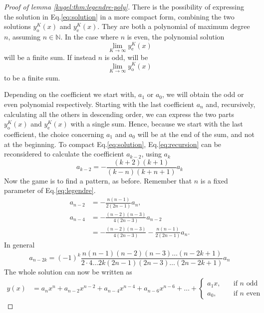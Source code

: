 \begin{proof}[Proof of lemma \ref{kugel:thm:legendre-poly}]
  There is the possibility of expressing the solution in Eq.\eqref{eq:solution} in a more compact form, combining the two solutions $y_\text{o}^K(x)$ and $y_\text{e}^K(x)$. They are both a polynomial of maximum degree $n$, assuming $n \in \mathbb{N}$. In the case where $n$ is even, the polynomial solution
  \begin{equation*}
    \lim_{K\to \infty} y_\text{e}^K(x)
  \end{equation*}
  will be a finite sum. If instead $n$ is odd, will be 
  \begin{equation*}
    \lim_{K\to \infty} y_\text{o}^K(x)
  \end{equation*}
  to be a finite sum. 

  Depending on the coefficient we start with, $a_1$ or $a_0$, we will obtain the odd or even polynomial respectively. Starting with the last coefficient $a_n$ and, recursively, calculating all the others in descending order, we can express the two parts $y_\text{o}^K(x)$ and $y_\text{e}^K(x)$ with a single sum. Hence, because we start with the last coefficient, the choice concerning $a_1$ and $a_0$ will be at the end of the sum, and not at the beginning. To compact Eq.\eqref{eq:solution}, Eq.\eqref{eq:recursion} can be reconsidered to calculate the coefficient $a_{k-2}$, using $a_k$
  \begin{equation*}
    a_{k-2} = -\frac{(k+2)(k+1)}{(k-n)(k+n+1)}a_k
  \end{equation*}
  Now the game is to find a pattern, as before. Remember that $n$ is a fixed parameter of Eq.\eqref{eq:legendre}.  
  \begin{align*}
    a_{n-2} &= -\frac{n(n-1)}{2(2n-1)}a_n, \\
    a_{n-4} &= -\frac{(n-2)(n-3)}{4(2n-3)}a_{n-2} \\
    &= -\frac{(n-2)(n-3)}{4(2n-3)}-\frac{n(n-1)}{2(2n-1)}a_n.
  \end{align*}
  In general 
  \begin{equation}\label{eq:general_recursion}
    a_{n-2k} = (-1)^k \frac{n(n-1)(n-2)(n-3) \hdots (n-2k+1)}{2\cdot4\hdots 2k(2n-1)(2n-3)\hdots(2n-2k+1)}a_n
  \end{equation}
  The whole solution can now be written as
  \begin{align}
    y(x) &= a_n x^n + a_{n-2} x^{n-2} + a_{n-4} x^{n-4} + a_{n-6} x^{n-6} + \hdots + \begin{cases} 
      a_1 x, \quad &\text{if } n \text{ odd} \\ 
      a_0, \quad  &\text{if } n \text{ even} 

\end{cases}
\end{align}
\end{proof}
